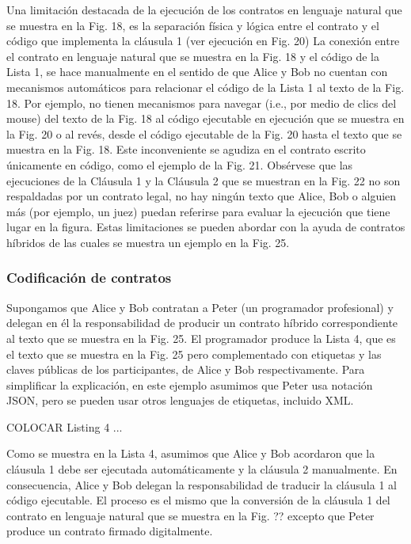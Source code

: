 \documentclass[12pt]{report} %
\begin{document}
\begin{itemize}
Una limitación destacada de la ejecución de los contratos en lenguaje natural que se muestra en la Fig. 18, es la separación física y lógica entre el contrato y el código que implementa la cláusula 1 (ver ejecución en Fig. 20) La conexión entre el contrato en lenguaje natural que se muestra en la Fig. 18 y el código de la Lista 1, se hace manualmente en el sentido de que Alice y Bob no cuentan con mecanismos automáticos para relacionar el código de la Lista 1 al texto de la Fig. 18. Por ejemplo, no tienen mecanismos para navegar (i.e., por medio de clics del mouse) del texto de la Fig. 18 al código ejecutable en ejecución que se muestra en la Fig. 20 o al revés, desde el código ejecutable de la Fig. 20 hasta el texto que se muestra en la Fig. 18. Este inconveniente se agudiza en el contrato escrito únicamente en código, como el ejemplo de la Fig. 21. Obsérvese que las ejecuciones de la Cláusula 1 y la Cláusula 2 que se muestran en la Fig. 22 no son respaldadas por un contrato legal, no hay ningún texto que Alice, Bob o alguien más (por ejemplo, un juez) puedan referirse para evaluar la ejecución que tiene lugar en la figura. Estas limitaciones se pueden abordar con la ayuda de contratos híbridos de las cuales se muestra un ejemplo en la Fig. 25.

\subsubsection{Codificación de contratos}

Supongamos que Alice y Bob contratan a Peter (un programador profesional) y delegan en él la responsabilidad de producir un contrato híbrido correspondiente al texto que se muestra en la Fig. 25. El programador produce la Lista 4, que es el texto que se muestra en la Fig. 25 pero complementado con etiquetas y las claves públicas de los participantes, de Alice y Bob respectivamente. Para simplificar la explicación, en este ejemplo asumimos que Peter usa notación JSON, pero se pueden usar otros lenguajes de etiquetas, incluido XML.

COLOCAR Listing 4 ...

Como se muestra en la Lista 4, asumimos que Alice y Bob acordaron que la cláusula 1 debe ser ejecutada automáticamente y la cláusula 2 manualmente. En consecuencia, Alice y Bob delegan la responsabilidad de traducir la cláusula 1 al código ejecutable. El proceso es el mismo que la conversión de la cláusula 1 del contrato en lenguaje natural que se muestra en la Fig. ?? excepto que Peter produce un contrato firmado digitalmente.


\end{itemize}
\end{document}
